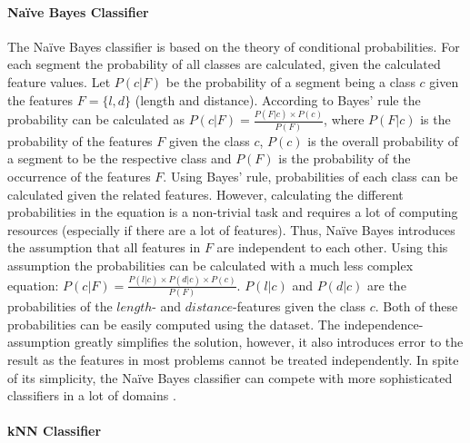 \paragraph{Naïve Bayes Classifier}

The Naïve Bayes classifier is based on the theory of conditional probabilities. For each segment the probability of all classes are calculated, given the calculated feature values. Let $P(c|F)$ be the probability of a segment being a class $c$ given the features $F = \{l, d\}$ (length and distance). According to Bayes' rule the probability can be calculated as $P(c|F) = \frac{P(F|c) \times P(c)}{P(F)}$, where $P(F|c)$ is the probability of the features $F$ given the class $c$, $P(c)$ is the overall probability of a segment to be the respective class and $P(F)$ is the probability of the occurrence of the features $F$. Using Bayes' rule, probabilities of each class can be calculated given the related features. However, calculating the different probabilities in the equation is a non-trivial task and requires a lot of computing resources (especially if there are a lot of features). Thus, Naïve Bayes introduces the assumption that all features in $F$ are independent to each other. Using this assumption the probabilities can be calculated with a much less complex equation: $P(c|F) = \frac{P(l|c) \times P(d|c) \times P(c)}{P(F)}$. $P(l|c)$ and $P(d|c)$ are the probabilities of the $length$- and $distance$-features given the class $c$. Both of these probabilities can be easily computed using the dataset. The independence-assumption greatly simplifies the solution, however, it also introduces error to the result as the features in most problems cannot be treated independently. In spite of its simplicity, the Naïve Bayes classifier can compete with more sophisticated classifiers in a lot of domains
 \cite{Hall2016_DataMining_ML}. 



\paragraph{kNN Classifier}

